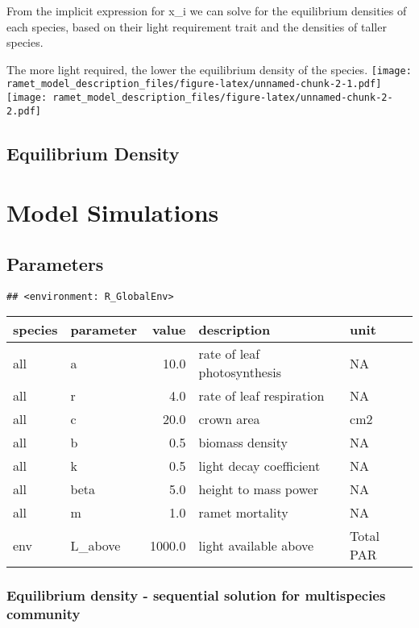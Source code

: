 \documentclass[
]{article}
\begin{document}
From the implicit expression for x\_i we can solve for the equilibrium
densities of each species, based on their light requirement trait and
the densities of taller species.

The more light required, the lower the equilibrium density of the
species.
\texttt{[image: ramet\_model\_description\_files/figure-latex/unnamed-chunk-2-1.pdf]}
\texttt{[image: ramet\_model\_description\_files/figure-latex/unnamed-chunk-2-2.pdf]}

\subsection{Equilibrium Density}\label{equilibrium-density}

\section{Model Simulations}\label{model-simulations}

\subsection{Parameters}\label{parameters}

\begin{verbatim}
## <environment: R_GlobalEnv>
\end{verbatim}

\begin{longtable}[]{@{}llrll@{}}
\toprule\noalign{}
species & parameter & value & description & unit \\
\midrule\noalign{}
\endhead
\bottomrule\noalign{}
\endlastfoot
all & a & 10.0 & rate of leaf photosynthesis & NA \\
all & r & 4.0 & rate of leaf respiration & NA \\
all & c & 20.0 & crown area & cm2 \\
all & b & 0.5 & biomass density & NA \\
all & k & 0.5 & light decay coefficient & NA \\
all & beta & 5.0 & height to mass power & NA \\
all & m & 1.0 & ramet mortality & NA \\
env & L\_above & 1000.0 & light available above & Total PAR \\
\end{longtable}

\subsubsection{Equilibrium density - sequential solution for
multispecies
community}\label{equilibrium-density---sequential-solution-for-multispecies-community}
\end{document}
